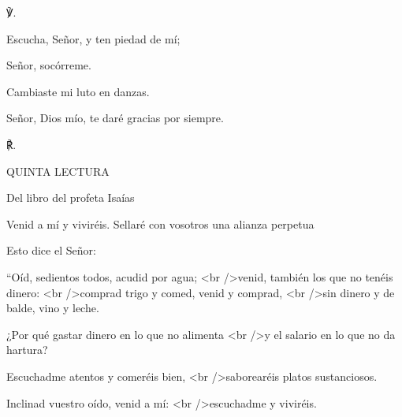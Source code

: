 			\begin{readbody}\begin{readred}℣.\end{readred} Escucha, Señor, y ten piedad de mí; \end{readbody}
			
			\begin{readtabbed}Señor, socórreme. \end{readtabbed}
			
			\begin{readtabbed}Cambiaste mi luto en danzas. \end{readtabbed}
			
			\begin{readtabbed}Señor, Dios mío, te daré gracias por siempre. \begin{readred}℟.\end{readred}\end{readtabbed}
			
			\begin{readtitle}QUINTA LECTURA\end{readtitle}
			
			\begin{readbook}Del libro del profeta Isaías \end{readbook}
			
			\begin{readtheme}Venid a mí y viviréis. Sellaré con vosotros una alianza perpetua\end{readtheme}
			
			\begin{readbody}Esto dice el Señor: \end{readbody}
			
			\begin{readtalk}“Oíd, sedientos todos, acudid por agua; <br />venid, también los que no tenéis dinero: <br />comprad trigo y comed, venid y comprad, <br />sin dinero y de balde, vino y leche. \end{readtalk}
			
			\begin{readtalk}¿Por qué gastar dinero en lo que no alimenta <br />y el salario en lo que no da hartura? \end{readtalk}
			
			\begin{readtalk}Escuchadme atentos y comeréis bien, <br />saborearéis platos sustanciosos. \end{readtalk}
			
			\begin{readtalk}Inclinad vuestro oído, venid a mí: <br />escuchadme y viviréis. \end{readtalk}
			
